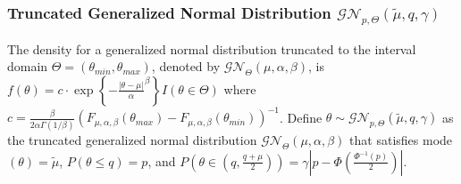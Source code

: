 \documentclass[useAMS,usenatbib,referee]{biom}
\begin{document}
\subsubsection{Truncated Generalized Normal Distribution $\mathcal{GN}_{p,\Theta}(\tilde{\mu},q,\gamma)$}
The density for a generalized normal distribution truncated to the interval domain $\Theta=(\theta_{min},\theta_{max})$, denoted by $\mathcal{GN}_\Theta(\mu,\alpha,\beta)$, is $f(\theta)=c\cdot\exp\left\{-\frac{|\theta-\mu|}{\alpha}^{\beta}\right\}{I(\theta\in \Theta)}$ where $c=\frac{\beta}{2\alpha \Gamma(1/\beta)}({F_{\mu,\alpha,\beta}(\theta_{max})-F_{\mu,\alpha,\beta}(\theta_{min})})^{-1}$. 
Define $\theta\sim\mathcal{GN}_{p,\Theta}(\tilde{\mu},q,\gamma)$ as the truncated generalized normal distribution $\mathcal{GN}_\Theta(\mu,\alpha,\beta)$ that satisfies mode$(\theta)=\tilde{\mu}$, $P(\theta\leq q)=p$, and $P(\theta\in(q,\frac{q+\mu}{2}))=\gamma|p-\Phi(\frac{\Phi^{-1}(p)}{2})|$.
%
\end{document}
